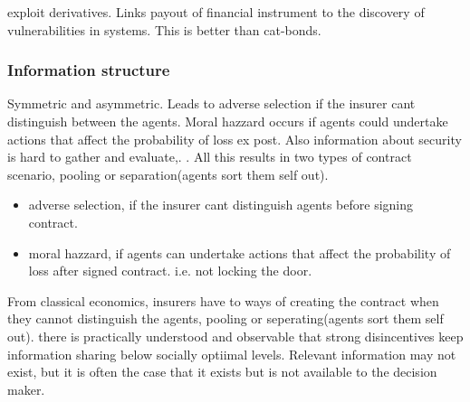 exploit derivatives. Links payout of financial instrument to the discovery of vulnerabilities in systems. This is better than cat-bonds. 
\subsubsection{Information structure}
Symmetric and asymmetric. Leads to adverse selection if the insurer cant distinguish
 between the agents. Moral hazzard occurs if agents could undertake actions that affect
  the probability of loss ex post. Also information about security is hard to gather and
   evaluate,. . All this results in two types of contract scenario, pooling or
    separation(agents sort them self out).
    \begin{itemize}
    \item adverse selection, if the insurer cant distinguish agents before signing contract.
    \item moral hazzard, if agents can undertake actions that affect the probability of loss after signed contract. i.e. not locking the door.
    \end{itemize}
    From classical economics, insurers have to ways of creating the contract when they cannot distinguish the agents, pooling or seperating(agents sort them self out).
    there is practically understood and observable that strong disincentives keep information sharing below socially optiimal levels. Relevant information may not exist, 
    but it is often the case that it exists but is not available to the decision maker.
